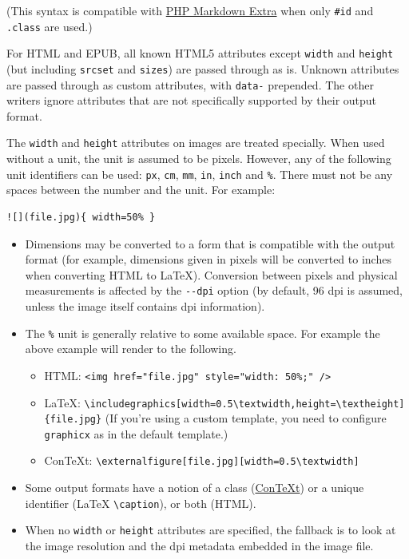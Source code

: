 \documentclass[
  b5paper
]{book}
\providecommand{\tightlist}{%
  \setlength{\itemsep}{0pt}\setlength{\parskip}{0pt}}
\begin{document}
(This syntax is compatible with
\href{https://michelf.ca/projects/php-markdown/extra/}{PHP Markdown
Extra} when only \texttt{\#id} and \texttt{.class} are used.)

For HTML and EPUB, all known HTML5 attributes except \texttt{width} and
\texttt{height} (but including \texttt{srcset} and \texttt{sizes}) are
passed through as is. Unknown attributes are passed through as custom
attributes, with \texttt{data-} prepended. The other writers ignore
attributes that are not specifically supported by their output format.

The \texttt{width} and \texttt{height} attributes on images are treated
specially. When used without a unit, the unit is assumed to be pixels.
However, any of the following unit identifiers can be used: \texttt{px},
\texttt{cm}, \texttt{mm}, \texttt{in}, \texttt{inch} and \texttt{\%}.
There must not be any spaces between the number and the unit. For
example:

\begin{verbatim}
![](file.jpg){ width=50% }
\end{verbatim}

\begin{itemize}
\tightlist
\item
  Dimensions may be converted to a form that is compatible with the
  output format (for example, dimensions given in pixels will be
  converted to inches when converting HTML to LaTeX). Conversion between
  pixels and physical measurements is affected by the \texttt{-\/-dpi}
  option (by default, 96 dpi is assumed, unless the image itself
  contains dpi information).
\item
  The \texttt{\%} unit is generally relative to some available space.
  For example the above example will render to the following.

  \begin{itemize}
  \tightlist
  \item
    HTML:
    \texttt{\textless{}img\ href="file.jpg"\ style="width:\ 50\%;"\ /\textgreater{}}
  \item
    LaTeX:
    \texttt{\textbackslash{}includegraphics{[}width=0.5\textbackslash{}textwidth,height=\textbackslash{}textheight{]}\{file.jpg\}}
    (If you're using a custom template, you need to configure
    \texttt{graphicx} as in the default template.)
  \item
    ConTeXt:
    \texttt{\textbackslash{}externalfigure{[}file.jpg{]}{[}width=0.5\textbackslash{}textwidth{]}}
  \end{itemize}
\item
  Some output formats have a notion of a class
  (\href{https://wiki.contextgarden.net/Using_Graphics\#Multiple_Image_Settings}{ConTeXt})
  or a unique identifier (LaTeX \texttt{\textbackslash{}caption}), or
  both (HTML).
\item
  When no \texttt{width} or \texttt{height} attributes are specified,
  the fallback is to look at the image resolution and the dpi metadata
  embedded in the image file.
\end{itemize}
\end{document}
